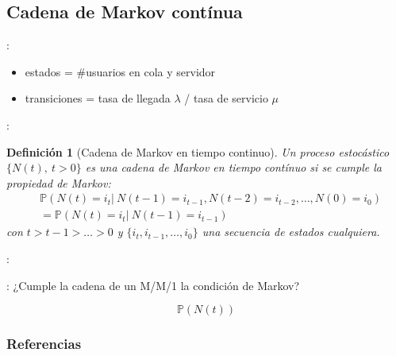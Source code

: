 \documentclass[xcolor={x11names}]{beamer}
\newtheorem{definicion}{Definición}[section]
\begin{document}
\subsection{Cadena de Markov contínua}

\begin{frame}{\secname: \subsecname}
    \begin{figure}
        
    \end{figure}

    \begin{figure}
        
    \end{figure}


    \vfill

    \begin{itemize}
        \item estados = \#usuarios en
            cola y servidor
        \item transiciones =
            tasa de llegada $\lambda$ /
            tasa de servicio $\mu$
    \end{itemize}
\end{frame}



\begin{frame}{\secname: \subsecname}
    \begin{definicion}[Cadena de Markov en tiempo continuo\cite{amable}]
        Un proceso estocástico $\{N(t),\ t>0\}$
        es una cadena de Markov en tiempo
        contínuo si se cumple la propiedad
        de Markov:
        \begin{align}
            & \mathbb{P}\left(N(t)=i_t|\ N(t-1)=i_{t-1}, N(t-2)=i_{t-2}, \ldots, N(0)=i_0\right)\nonumber\\
            & = \mathbb{P}\left(N(t)=i_t|\ N(t-1)=i_{t-1}\right)
        \end{align}
        con $t>t-1>\ldots>0$ y
        $\{i_t,i_{t-1},\ldots,i_0\}$ una secuencia
        de estados cualquiera.
    \end{definicion}
\end{frame}





\begin{frame}{\secname: \subsecname}
    \begin{figure}
        
    \end{figure}
\end{frame}




\begin{frame}{\secname: \subsecname}
    ¿Cumple la cadena de un M/M/1 la condición
    de Markov? 

    \begin{equation*}
        \mathbb{P}(N(t) )
    \end{equation*}
\end{frame}





\begin{frame}[allowframebreaks]
        \frametitle{Referencias}
        
        
\end{frame}
\end{document}

